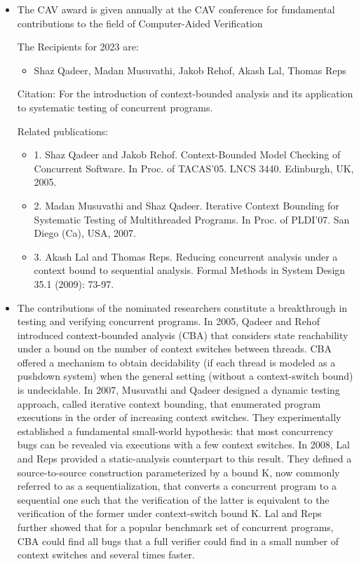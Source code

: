 \documentclass[prodmode,acmtecs]{acmsmall} %
\begin{document}
\begin{itemize}\item  The CAV award is given annually at the CAV conference for fundamental contributions to the field of Computer-Aided Verification 
 
  The Recipients for 2023 are: 
 
\begin{itemize}\item  Shaz Qadeer, Madan Musuvathi, Jakob Rehof, Akash Lal, Thomas Reps
\end{itemize} 
  Citation: For the introduction of context-bounded analysis and its application to systematic testing of concurrent programs. 
 
  Related publications: 
 
\begin{itemize}\item  1. Shaz Qadeer and Jakob Rehof. Context-Bounded Model Checking of Concurrent Software. In Proc. of TACAS'05. LNCS 3440. Edinburgh, UK, 2005.
\item  2. Madan Musuvathi and Shaz Qadeer. Iterative Context Bounding for Systematic Testing of Multithreaded Programs. In Proc. of PLDI'07. San Diego (Ca), USA, 2007.
\item  3. Akash Lal and Thomas Reps. Reducing concurrent analysis under a context bound to sequential analysis. Formal Methods in System Design 35.1 (2009): 73-97.
\end{itemize} 
\item  The contributions of the nominated researchers constitute a breakthrough in testing and verifying concurrent programs. In 2005, Qadeer and Rehof introduced context-bounded analysis (CBA) that considers state reachability under a bound on the number of context switches between threads. CBA offered a mechanism to obtain decidability (if each thread is modeled as a pushdown system) when the general setting (without a context-switch bound) is undecidable. In 2007, Musuvathi and Qadeer designed a dynamic testing approach, called iterative context bounding, that enumerated program executions in the order of increasing context switches. They experimentally established a fundamental small-world hypothesis: that most concurrency bugs can be revealed via executions with a few context switches. In 2008, Lal and Reps provided a static-analysis counterpart to this result. They defined a source-to-source construction parameterized by a bound K, now commonly referred to as a sequentialization, that converts a concurrent program to a sequential one such that the verification of the latter is equivalent to the verification of the former under context-switch bound K. Lal and Reps further showed that for a popular benchmark set of concurrent programs, CBA could find all bugs that a full verifier could find in a small number of context switches and several times faster. 
 

\end{itemize}
\end{document}
